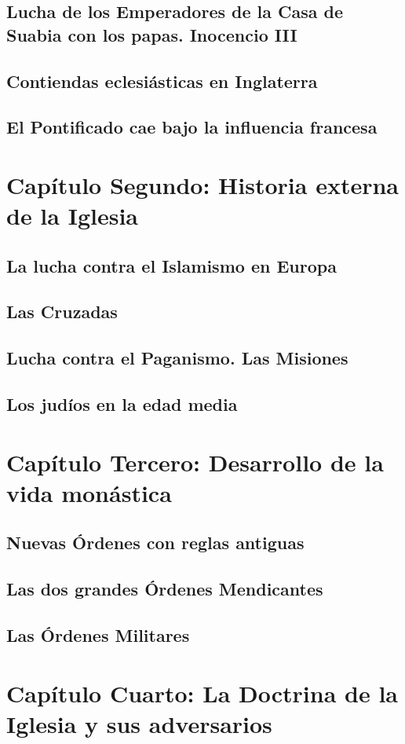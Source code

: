 \raggedbottom{} \documentclass[12pt, a4paper]{book}
\begin{document}
\section{Lucha de los Emperadores de la Casa de Suabia con los papas. Inocencio III}
\section{Contiendas eclesiásticas en Inglaterra}
\section{El Pontificado cae bajo la influencia francesa}
\chapter{Capítulo Segundo: Historia externa de  la Iglesia}
\section{La lucha contra el Islamismo en Europa}
\section{Las Cruzadas}
\section{Lucha contra el Paganismo. Las Misiones}
\section{Los judíos en la edad media}
\chapter{Capítulo Tercero: Desarrollo de la vida monástica}
\section{Nuevas Órdenes con reglas antiguas}
\section{Las dos grandes Órdenes Mendicantes}
\section{Las Órdenes Militares}
\chapter{Capítulo Cuarto: La Doctrina de la Iglesia y sus adversarios}
\end{document}

